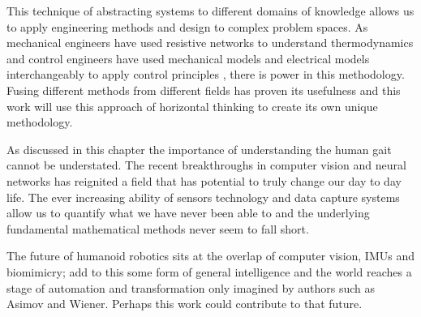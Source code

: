 This technique of abstracting systems to different domains of knowledge allows us to apply engineering methods and design to complex problem spaces. As mechanical engineers have used resistive networks to understand thermodynamics \cite{chen2015electrical} and control engineers have used mechanical models and electrical models interchangeably to apply control principles \cite{karnopp2012system}, there is power in this methodology. Fusing different methods from different fields has proven its usefulness and this work will use this approach of horizontal thinking to create its own unique methodology.

As discussed in this chapter the importance of understanding the human gait cannot be understated. The recent breakthroughs in computer vision and neural networks has reignited a field that has potential to truly change our day to day life. The ever increasing ability of sensors technology and data capture systems allow us to quantify what we have never been able to and the underlying fundamental mathematical methods never seem to fall short.

The future of humanoid robotics sits at the overlap of computer vision, IMUs and biomimicry; add to this some form of general intelligence and the world reaches a stage of automation and transformation only imagined by authors such as Asimov and Wiener. Perhaps this work could contribute to that future.

































